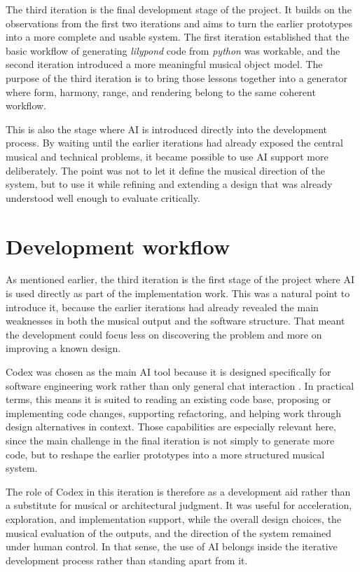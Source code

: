 The third iteration is the final development stage of the project. It builds on the observations from the first two iterations and aims to turn the earlier prototypes into a more complete and usable system. The first iteration established that the basic workflow of generating \textit{lilypond} code from \textit{python} was workable, and the second iteration introduced a more meaningful musical object model. The purpose of the third iteration is to bring those lessons together into a generator where form, harmony, range, and rendering belong to the same coherent workflow.

This is also the stage where \ac{AI} is introduced directly into the development process. By waiting until the earlier iterations had already exposed the central musical and technical problems, it became possible to use \ac{AI} support more deliberately. The point was not to let it define the musical direction of the system, but to use it while refining and extending a design that was already understood well enough to evaluate critically.

\section{Development workflow}

  As mentioned earlier, the third iteration is the first stage of the project where \ac{AI} is used directly as part of the implementation work. This was a natural point to introduce it, because the earlier iterations had already revealed the main weaknesses in both the musical output and the software structure. That meant the development could focus less on discovering the problem and more on improving a known design.

  Codex was chosen as the main \ac{AI} tool because it is designed specifically for software engineering work rather than only general chat interaction \cite{CodexAICoding,CodexNowGenerally2026}. In practical terms, this means it is suited to reading an existing code base, proposing or implementing code changes, supporting refactoring, and helping work through design alternatives in context. Those capabilities are especially relevant here, since the main challenge in the final iteration is not simply to generate more code, but to reshape the earlier prototypes into a more structured musical system.

  The role of Codex in this iteration is therefore as a development aid rather than a substitute for musical or architectural judgment. It was useful for acceleration, exploration, and implementation support, while the overall design choices, the musical evaluation of the outputs, and the direction of the system remained under human control. In that sense, the use of \ac{AI} belongs inside the iterative development process rather than standing apart from it.

